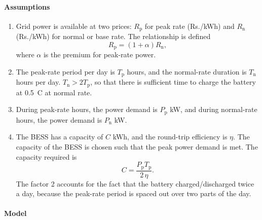 \documentclass[a4paper]{article}
\begin{document}
\paragraph{Assumptions}
\begin{enumerate}
    \item Grid power is available at two prices: $R_{\text{p}}$ for peak
    rate (Rs./kWh) and $R_{\text{n}}$ (Rs./kWh) for normal or base rate.
    The relationship is defined
    \begin{equation}
        R_{\text{p}} = (1 + \alpha) R_{\text{n}},
    \end{equation} 
    where $\alpha$ is the premium for peak-rate power.

    \item The peak-rate period per day is $T_{\text{p}}$ hours, and the 
    normal-rate duration is $T_{\text{n}}$ hours per day.
    $T_{\text{n}} > 2 T_{\text{p}} $, so that there is sufficient time 
    to charge the battery at 0.5~C at normal rate. 

    \item During peak-rate hours, the power demand is $P_{\text{p}}$ kW, 
    and during normal-rate hours, the power demand is $P_{\text{n}}$ kW.

    \item The BESS has a capacity of $C$ kWh, and the round-trip efficiency 
    is $\eta$.
    The capacity of the BESS is chosen such that the peak power demand is met. 
    The capacity required is
    \begin{equation}
        C = \frac{P_{\text{p}} T_{\text{p}} }{2 \, \eta}.
    \end{equation}
    The factor 2 accounts for the fact that the battery charged/discharged twice a day,
    because the peak-rate period is spaced out over two parts of the day.


\end{enumerate}

\paragraph{Model}
\end{document}
